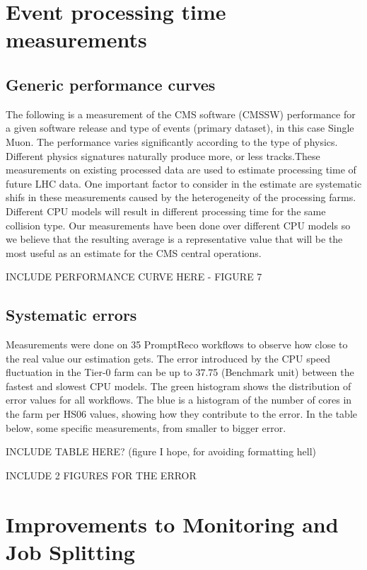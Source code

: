 \documentclass[a4paper]{jpconf}
\begin{document}
\section{Event processing time measurements}

\subsection{Generic performance curves}
The following is a measurement of the CMS software (CMSSW) performance for a given software release and type of events (primary dataset), in this case Single Muon. The performance varies significantly according to the type of physics. Different physics signatures naturally produce more, or less tracks.These measurements on existing processed data are used to estimate processing time of future LHC data. One important factor to consider in the estimate are systematic shifs in these measurements caused by the heterogeneity of the processing farms. Different CPU models will result in different processing time for the same collision type. Our measurements have been done over different CPU models so we believe that the resulting average is a representative value that will be the most useful as an estimate for the CMS central operations.

INCLUDE PERFORMANCE CURVE HERE - FIGURE 7

\subsection{Systematic errors}

Measurements were done on 35 PromptReco workflows to observe 
how close to the real value our estimation gets. The error 
introduced by the CPU speed fluctuation in the Tier-0 farm can be 
up to 37.75%
(Benchmark unit) between the fastest and slowest CPU models.
The green histogram shows the distribution of error values for all 
workflows. The blue is a histogram of the number of cores in the 
farm per HS06 values, showing how they contribute to the error. In 
the table below, some specific measurements, from smaller to 
bigger error.

INCLUDE TABLE HERE? (figure I hope, for avoiding formatting hell)

INCLUDE 2 FIGURES FOR THE ERROR

\section{Improvements to Monitoring and Job Splitting}
\end{document}

